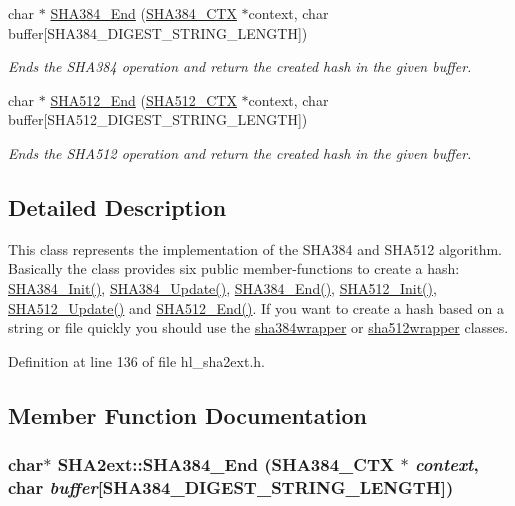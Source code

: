 \begin{DoxyCompactItemize}
char $\ast$ \hyperlink{class_s_h_a2ext_a5e99e4b8c5327799cef436e5e187423b}{SHA384\_\-End} (\hyperlink{struct_s_h_a512___c_t_x}{SHA384\_\-CTX} $\ast$context, char buffer\mbox{[}SHA384\_\-DIGEST\_\-STRING\_\-LENGTH\mbox{]})
\begin{DoxyCompactList}\small\item\em Ends the SHA384 operation and return the created hash in the given buffer. \item\end{DoxyCompactList}\item 
char $\ast$ \hyperlink{class_s_h_a2ext_aa1d46fec9075d0b36397aa010b4329fb}{SHA512\_\-End} (\hyperlink{struct_s_h_a512___c_t_x}{SHA512\_\-CTX} $\ast$context, char buffer\mbox{[}SHA512\_\-DIGEST\_\-STRING\_\-LENGTH\mbox{]})
\begin{DoxyCompactList}\small\item\em Ends the SHA512 operation and return the created hash in the given buffer. \item\end{DoxyCompactList}\end{DoxyCompactItemize}


\subsection{Detailed Description}
This class represents the implementation of the SHA384 and SHA512 algorithm. Basically the class provides six public member-\/functions to create a hash: \hyperlink{class_s_h_a2ext_a9d1e59ec49bf28e9ce1b059e0d34492b}{SHA384\_\-Init()}, \hyperlink{class_s_h_a2ext_a910da8d255cde7a69d0149c7ad15fce3}{SHA384\_\-Update()}, \hyperlink{class_s_h_a2ext_a5e99e4b8c5327799cef436e5e187423b}{SHA384\_\-End()}, \hyperlink{class_s_h_a2ext_aedf1c75293856456cbdba6c5aca62fdd}{SHA512\_\-Init()}, \hyperlink{class_s_h_a2ext_a11dbee3c0b8423d99d1b6a2ab82578b8}{SHA512\_\-Update()} and \hyperlink{class_s_h_a2ext_aa1d46fec9075d0b36397aa010b4329fb}{SHA512\_\-End()}. If you want to create a hash based on a string or file quickly you should use the \hyperlink{classsha384wrapper}{sha384wrapper} or \hyperlink{classsha512wrapper}{sha512wrapper} classes. 

Definition at line 136 of file hl\_\-sha2ext.h.

\subsection{Member Function Documentation}
\hypertarget{class_s_h_a2ext_a5e99e4b8c5327799cef436e5e187423b}{
\subsubsection[{SHA384\_\-End}]{\setlength{\rightskip}{0pt plus 5cm}char$\ast$ SHA2ext::SHA384\_\-End ({\bf SHA384\_\-CTX} $\ast$ {\em context}, \/  char {\em buffer}\mbox{[}SHA384\_\-DIGEST\_\-STRING\_\-LENGTH\mbox{]})}}
\label{class_s_h_a2ext_a5e99e4b8c5327799cef436e5e187423b}


